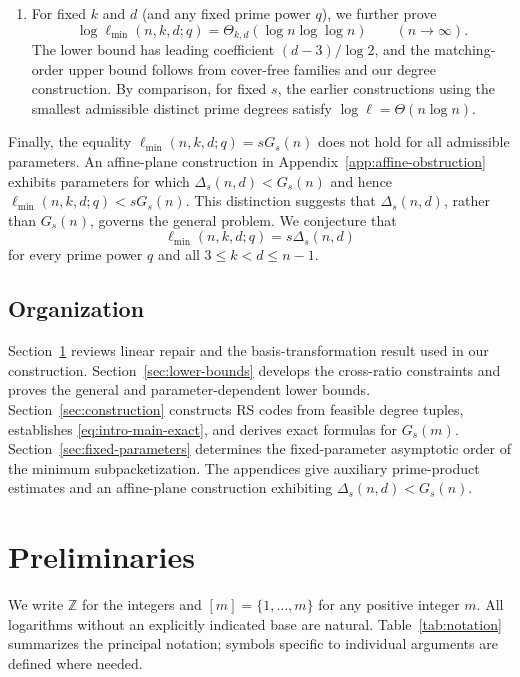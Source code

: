 \documentclass[11pt,onecolumn]{IEEEtran}
\newcommand{\ellmin}{\ell_{\min}}
\begin{document}
\begin{enumerate}
\item For fixed $k$ and $d$ (and any fixed prime power $q$), we further prove
\[
\log\ellmin(n,k,d;q)
=\Theta_{k,d}(\log n\log\log n)
\qquad(n\to\infty).
\]
The lower bound has leading coefficient $(d-3)/\log2$, and the
matching-order upper bound follows from cover-free families and
our degree construction. By comparison, for fixed $s$, the earlier constructions using the smallest admissible distinct prime degrees satisfy $\log\ell=\Theta(n\log n)$.

\end{enumerate}

Finally, the equality $\ellmin(n,k,d;q)=sG_s(n)$ does not hold
for all admissible parameters.  An affine-plane construction in
Appendix~\ref{app:affine-obstruction} exhibits parameters for which
$\Delta_s(n,d)<G_s(n)$ and hence
$\ellmin(n,k,d;q)<sG_s(n)$.  This distinction suggests that
$\Delta_s(n,d)$, rather than $G_s(n)$, governs the general problem.
We conjecture that
\[
\ellmin(n,k,d;q)=s\Delta_s(n,d)
\]
for every prime power $q$ and all $3\le k<d\le n-1$.

\subsection{Organization}
Section~\ref{sec:prelim} reviews linear repair and the
basis-transformation result used in our construction.
Section~\ref{sec:lower-bounds} develops the cross-ratio constraints
and proves the general and parameter-dependent lower bounds.
Section~\ref{sec:construction} constructs RS codes from feasible
degree tuples, establishes \eqref{eq:intro-main-exact}, and derives
exact formulas for $G_s(m)$.  Section~\ref{sec:fixed-parameters} determines the
fixed-parameter asymptotic order of the minimum subpacketization.
The appendices give auxiliary prime-product estimates and an
affine-plane construction exhibiting $\Delta_s(n,d)<G_s(n)$.

\section{Preliminaries}
\label{sec:prelim}

We write $\mathbb Z$ for the integers and $[m]=\{1,\ldots,m\}$
for any positive integer $m$. All logarithms without an
explicitly indicated base are natural. Table~\ref{tab:notation} summarizes
the principal notation; symbols specific to individual arguments
are defined where needed.
\end{document}
